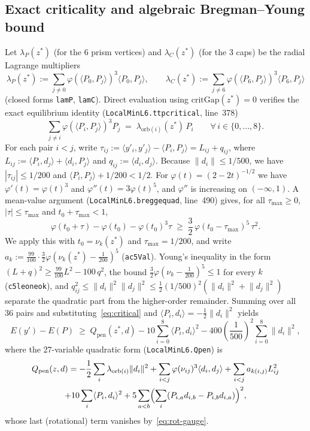 \documentclass[11pt,reqno]{amsart}
\renewcommand{\_}{\origunderscore\allowbreak}
\theoremstyle{definition}
\newcommand{\ip}[2]{\langle #1, #2 \rangle}
\newcommand{\norm}[1]{\lVert #1 \rVert}
\begin{document}
\subsection{Exact criticality and algebraic Bregman--Young bound}\label{subsec:bregman}
Let $\lambda_P(z^*)$ (for the $6$ prism vertices) and $\lambda_C(z^*)$ (for the $3$ caps) be the radial Lagrange multipliers
\[
  \lambda_P(z^*) := \sum_{j \ne 0} \varphi(\ip{P_0}{P_j})^3 \ip{P_0}{P_j}, \qquad
  \lambda_C(z^*) := \sum_{j \ne 6} \varphi(\ip{P_6}{P_j})^3 \ip{P_6}{P_j}
\]
(closed forms \texttt{lamP}, \texttt{lamC}).
Direct evaluation using $\mathrm{critGap}(z^*) = 0$ verifies the exact equilibrium identity (\texttt{LocalMinL6.ttp\_critical}, line~378)
\begin{equation}\label{eq:critical}
  \sum_{j \ne i} \varphi(\ip{P_i}{P_j})^3 P_j \;=\; \lambda_{\mathrm{orb}(i)}(z^*)\, P_i \qquad \forall\, i \in \{0,\dots,8\}.
\end{equation}
For each pair $i < j$, write $\tau_{ij} := \ip{y'_i}{y'_j} - \ip{P_i}{P_j} = L_{ij} + q_{ij}$, where $L_{ij} := \ip{P_i}{d_j} + \ip{d_i}{P_j}$ and $q_{ij} := \ip{d_i}{d_j}$.
Because $\norm{d_i} \le 1/500$, we have $|\tau_{ij}| \le 1/200$ and $\ip{P_i}{P_j} + 1/200 < 1/2$.
For $\varphi(t) = (2-2t)^{-1/2}$ we have $\varphi'(t) = \varphi(t)^3$ and $\varphi''(t) = 3\varphi(t)^5$, and $\varphi''$ is increasing on $(-\infty, 1)$. A mean-value argument (\texttt{LocalMinL6.breg\_ge\_quad}, line~490) gives, for all $\tau_{\max} \ge 0$, $|\tau| \le \tau_{\max}$ and $t_0 + \tau_{\max} < 1$,
\[
  \varphi(t_0 + \tau) - \varphi(t_0) - \varphi(t_0)^3 \tau
  \;\ge\; \frac{3}{2}\,\varphi(t_0 - \tau_{\max})^5\, \tau^2.
\]
We apply this with $t_0 = \nu_k(z^*)$ and $\tau_{\max} = 1/200$, and write $a_k := \frac{99}{100}\cdot\frac{3}{2}\varphi(\nu_k(z^*) - \frac{1}{200})^5$ (\texttt{ac5Val}). Young's inequality in the form $(L+q)^2 \ge \frac{99}{100}L^2 - 100\, q^2$, the bound $\frac{3}{2}\varphi(\nu_k - \frac{1}{200})^5 \le 1$ for every $k$ (\texttt{c5\_le\_one\_ok}), and $q_{ij}^2 \le \norm{d_i}^2 \norm{d_j}^2 \le \frac{1}{2}(1/500)^2(\norm{d_i}^2 + \norm{d_j}^2)$ separate the quadratic part from the higher-order remainder.
Summing over all $36$ pairs and substituting~\eqref{eq:critical} and $\ip{P_i}{d_i} = -\frac{1}{2}\norm{d_i}^2$ yields
\begin{equation}\label{eq:E-ge-Qpen}
  E(y') - E(P) \;\ge\; Q_{\mathrm{pen}}(z^*, d) - 10\sum_{i=0}^8 \ip{P_i}{d_i}^2 - 400\left(\frac{1}{500}\right)^2 \sum_{i=0}^8 \norm{d_i}^2,
\end{equation}
where the $27$-variable quadratic form (\texttt{LocalMinL6.Q\_pen}) is
\begin{multline*}
  Q_{\mathrm{pen}}(z, d) = -\frac{1}{2}\sum_i \lambda_{\mathrm{orb}(i)}\norm{d_i}^2 + \sum_{i<j}\varphi(\nu_{ij})^3\ip{d_i}{d_j} + \sum_{i<j} a_{k(i,j)} L_{ij}^2 \\
  + 10\sum_i \ip{P_i}{d_i}^2 + 5\sum_{a<b}\Bigl(\sum_i (P_{i,a}d_{i,b} - P_{i,b}d_{i,a})\Bigr)^2,
\end{multline*}
whose last (rotational) term vanishes by~\eqref{eq:rot-gauge}.
\end{document}
